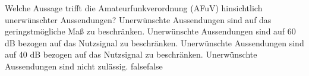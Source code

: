     {Welche Aussage trifft die Amateurfunkverordnung (AFuV) hinsichtlich unerwünschter Aussendungen?}
    {Unerwünschte Aussendungen sind auf das geringstmögliche Maß zu beschränken.}
    {Unerwünschte Aussendungen sind auf 60 dB bezogen auf das Nutzsignal zu beschränken.}
    {Unerwünschte Aussendungen sind auf 40 dB bezogen auf das Nutzsignal zu beschränken.}
    {Unerwünschte Aussendungen sind nicht zulässig.}
    {false}{false}
